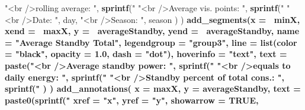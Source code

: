 \documentclass[
]{book}
\newenvironment{Shaded}{\begin{snugshade}}{\end{snugshade}}
\newcommand{\DataTypeTok}[1]{\textcolor[rgb]{0.13,0.29,0.53}{#1}}
\newcommand{\DecValTok}[1]{\textcolor[rgb]{0.00,0.00,0.81}{#1}}
\newcommand{\FloatTok}[1]{\textcolor[rgb]{0.00,0.00,0.81}{#1}}
\newcommand{\KeywordTok}[1]{\textcolor[rgb]{0.13,0.29,0.53}{\textbf{#1}}}
\newcommand{\NormalTok}[1]{#1}
\newcommand{\OperatorTok}[1]{\textcolor[rgb]{0.81,0.36,0.00}{\textbf{#1}}}
\newcommand{\OtherTok}[1]{\textcolor[rgb]{0.56,0.35,0.01}{#1}}
\newcommand{\StringTok}[1]{\textcolor[rgb]{0.31,0.60,0.02}{#1}}
\let\oldShaded\Shaded
\let\endoldShaded\endShaded
\renewenvironment{Shaded}{\footnotesize\oldShaded}{\endoldShaded}
\begin{document}
\begin{Shaded}
\begin{Highlighting}[]
{{{{{{{{{{{{{{{{{{{{{{{{{{{{{{{{{{{{{{{{{{{{{{{{{{{{{{{{{{{{{{{{{{{{                           \StringTok{"<br />rolling average:        "}\NormalTok{, }\KeywordTok{sprintf}\NormalTok{(}\StringTok{"%
                           \StringTok{"<br />Average vis. points: "}\NormalTok{, }\KeywordTok{sprintf}\NormalTok{(}\StringTok{"%
                           \StringTok{"<br />Date:                        "}\NormalTok{, day,}
                           \StringTok{"<br />Season:                   "}\NormalTok{, season}
\NormalTok{            )}
\NormalTok{  ) }\OperatorTok{%
\StringTok{  }\KeywordTok{add_segments}\NormalTok{(}\DataTypeTok{x =} \OperatorTok{~}\NormalTok{minX,}
               \DataTypeTok{xend =} \OperatorTok{~}\NormalTok{maxX,}
               \DataTypeTok{y =} \OperatorTok{~}\NormalTok{averageStandby,}
               \DataTypeTok{yend =} \OperatorTok{~}\NormalTok{averageStandby,}
               \DataTypeTok{name =} \StringTok{"Average Standby Total"}\NormalTok{,}
               \DataTypeTok{legendgroup =} \StringTok{"group3"}\NormalTok{,}
               \DataTypeTok{line =} \KeywordTok{list}\NormalTok{(}\DataTypeTok{color =} \StringTok{"black"}\NormalTok{, }\DataTypeTok{opacity =} \FloatTok{1.0}\NormalTok{, }\DataTypeTok{dash =} \StringTok{"dot"}\NormalTok{),}
               \DataTypeTok{hoverinfo =} \StringTok{"text"}\NormalTok{,}
               \DataTypeTok{text =} \OperatorTok{~}\StringTok{ }\KeywordTok{paste}\NormalTok{(}\StringTok{"<br />Average standby power:          "}\NormalTok{, }\KeywordTok{sprintf}\NormalTok{(}\StringTok{"%
                              \StringTok{"<br />equals to daily energy:         "}\NormalTok{, }\KeywordTok{sprintf}\NormalTok{(}\StringTok{"%
                              \StringTok{"<br />Standby percent of total cons.: "}\NormalTok{, }\KeywordTok{sprintf}\NormalTok{(}\StringTok{"%
\NormalTok{               )}
\NormalTok{  ) }\OperatorTok{%
\StringTok{  }\KeywordTok{add_annotations}\NormalTok{(}
    \DataTypeTok{x =}\NormalTok{ maxX,}
    \DataTypeTok{y =}\NormalTok{ averageStandby,}
    \DataTypeTok{text =} \KeywordTok{paste0}\NormalTok{(}\KeywordTok{sprintf}\NormalTok{(}\StringTok{"%
    \DataTypeTok{xref =} \StringTok{"x"}\NormalTok{,}
    \DataTypeTok{yref =} \StringTok{"y"}\NormalTok{,}
    \DataTypeTok{showarrow =} \OtherTok{TRUE}\NormalTok{,}
}}}}}}}}}}}}}}}}}}}}}}}}}}}}}}}}}}}}}}}}}}}}}}}}}}}}}}}}}}}}}}}}}}}}}}}}}}}}
\end{Highlighting}
\end{Shaded}
\end{document}
